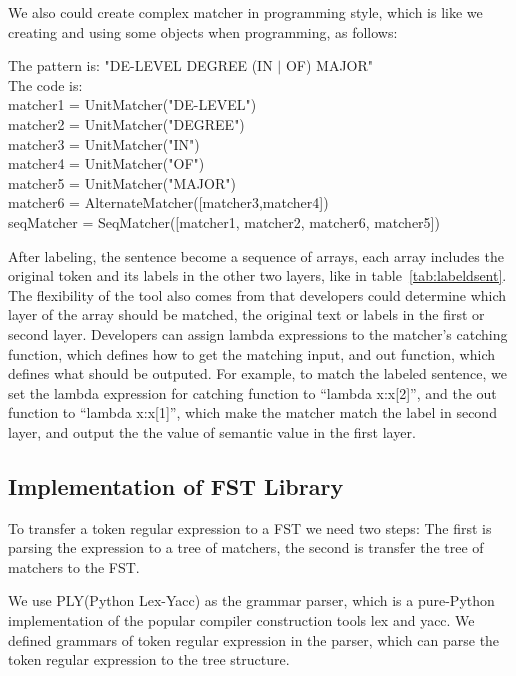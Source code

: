 We also could create complex matcher in programming style, which is like we creating and using some objects when programming, as follows:

\begin{framed}
\small
\noindent
The pattern is:  "DE-LEVEL DEGREE (IN $\vert$ OF) MAJOR" \\
The code is: \\
matcher1 = UnitMatcher("DE-LEVEL") \\
matcher2 = UnitMatcher("DEGREE")  \\
matcher3 = UnitMatcher("IN")   \\
matcher4 = UnitMatcher("OF")   \\
matcher5 = UnitMatcher("MAJOR")  \\
matcher6 = AlternateMatcher([matcher3,matcher4])   \\
seqMatcher = SeqMatcher([matcher1, matcher2, matcher6, matcher5])
 
\end{framed}

After labeling, the sentence become a sequence of arrays, each array includes the original token and its labels in the other two layers, like in table~\ref{tab:labeldsent}. The flexibility of the tool also comes from that developers could determine which layer of the array should be matched, the original text or labels in the first or second layer.  Developers can assign lambda expressions to the matcher's catching function, which defines how to get the matching input,  and out function, which defines what should be outputed. For example, to match the labeled sentence, we set the lambda expression for catching function to ``lambda x:x[2]'', and the out function to ``lambda x:x[1]'', which make the matcher match the label in second layer, and output the the value of semantic value in the first layer.

\subsection{Implementation of FST Library }

To transfer a token regular expression to a FST we need two steps: The first is parsing the expression to a tree of matchers, the second is transfer the tree of matchers to the FST.

We use PLY(Python Lex-Yacc) as the grammar parser, which  is a pure-Python implementation of the popular compiler construction tools lex and yacc. We defined  grammars of token regular expression in the parser, which can parse the token regular expression to the tree structure.

